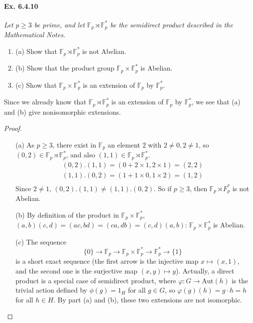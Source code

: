 \documentclass[11pt,a4paper]{article}
\newcommand{\be} {\begin{enumerate}}
\newcommand{\ee} {\end{enumerate}}
\newcommand{\F}{\mathbb{F}}
\begin{document}
\paragraph{Ex. 6.4.10}

{\it Let $p\geq 3$ be prime, and let $\F_p \rtimes \F_p^*$ be the semidirect product described in the Mathematical Notes.
\be
\item[(a)] Show that $\F_p \rtimes \F_p^*$ is not Abelian.
\item[(b)] Show that the product group $\F_p \times \F_p^*$ is Abelian.
\item[(c)] Show that $\F_p \times \F_p^*$ is an extension of $\F_p$ by $\F_p^*$.
\ee
Since we already know that $\F_p \rtimes \F_p^*$ is an extension of $\F_p$ by $\F_p^*$, we see that (a) and (b) give nonisomorphic extensions.
}

\begin{proof}
\begin{enumerate}
\item[(a)]
As $p\geq 3$, there exist in  $\F_p$ an element $2$ with $2\neq 0,2\neq 1$, so $(0,2) \in \F_p \rtimes \F_p^*$, and also $(1,1) \in \F_p \rtimes \F_p^*$.
\begin{align*}
(0,2) . (1,1) = (0+2\times 1,2\times 1)=(2,2)\\
(1,1). (0,2) = (1+1\times0,1\times 2) = (1,2) \\
\end{align*}
Since $2\neq 1$,  $(0,2) . (1,1) \neq (1,1). (0,2)$. So if $p\geq 3$, then $\F_p \rtimes F_p^*$ is not Abelian.

\item[(b)]
By definition of the product in $\F_p \times \F_p^*$, $(a,b)(c,d) = (ac,bd) = (ca,db) = (c,d)(a,b)$: $\F_p \times \F_p^*$ is Abelian.

\item[(c)]The sequence
$$\{0\} \to \F_p \to \F_p \times \F_p^* \to \F_p^* \to \{1\}$$
is a short exact sequence (the first arrow is the injective map $x \mapsto (x,1)$, and the second one is the surjective map $(x,y) \mapsto y$).  Actually, a direct product is a special case of semidirect product, where $\varphi : G \to \mathrm{Aut}(h)$ is the trivial action defined by $\phi(g) = 1_H$ for all $g\in G$, so $\varphi(g)(h) = g\cdot h = h$ for all $h \in H$. By part (a) and (b), these two extensions are not isomorphic.

\end{enumerate}
\end{proof}
\end{document}
